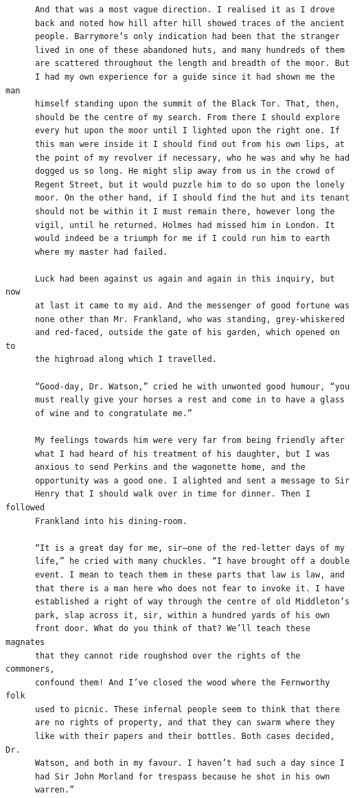 \documentclass{article}
\begin{document}
\begin{verbatim}
      And that was a most vague direction. I realised it as I drove
      back and noted how hill after hill showed traces of the ancient
      people. Barrymore’s only indication had been that the stranger
      lived in one of these abandoned huts, and many hundreds of them
      are scattered throughout the length and breadth of the moor. But
      I had my own experience for a guide since it had shown me the man
      himself standing upon the summit of the Black Tor. That, then,
      should be the centre of my search. From there I should explore
      every hut upon the moor until I lighted upon the right one. If
      this man were inside it I should find out from his own lips, at
      the point of my revolver if necessary, who he was and why he had
      dogged us so long. He might slip away from us in the crowd of
      Regent Street, but it would puzzle him to do so upon the lonely
      moor. On the other hand, if I should find the hut and its tenant
      should not be within it I must remain there, however long the
      vigil, until he returned. Holmes had missed him in London. It
      would indeed be a triumph for me if I could run him to earth
      where my master had failed.

      Luck had been against us again and again in this inquiry, but now
      at last it came to my aid. And the messenger of good fortune was
      none other than Mr. Frankland, who was standing, grey-whiskered
      and red-faced, outside the gate of his garden, which opened on to
      the highroad along which I travelled.

      “Good-day, Dr. Watson,” cried he with unwonted good humour, “you
      must really give your horses a rest and come in to have a glass
      of wine and to congratulate me.”

      My feelings towards him were very far from being friendly after
      what I had heard of his treatment of his daughter, but I was
      anxious to send Perkins and the wagonette home, and the
      opportunity was a good one. I alighted and sent a message to Sir
      Henry that I should walk over in time for dinner. Then I followed
      Frankland into his dining-room.

      “It is a great day for me, sir—one of the red-letter days of my
      life,” he cried with many chuckles. “I have brought off a double
      event. I mean to teach them in these parts that law is law, and
      that there is a man here who does not fear to invoke it. I have
      established a right of way through the centre of old Middleton’s
      park, slap across it, sir, within a hundred yards of his own
      front door. What do you think of that? We’ll teach these magnates
      that they cannot ride roughshod over the rights of the commoners,
      confound them! And I’ve closed the wood where the Fernworthy folk
      used to picnic. These infernal people seem to think that there
      are no rights of property, and that they can swarm where they
      like with their papers and their bottles. Both cases decided, Dr.
      Watson, and both in my favour. I haven’t had such a day since I
      had Sir John Morland for trespass because he shot in his own
      warren.”


\end{verbatim}
\end{document}
